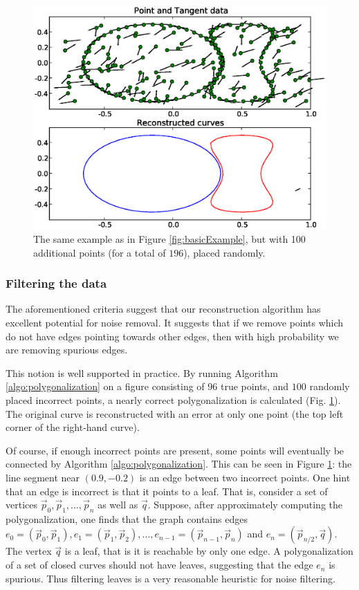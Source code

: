 \documentclass{article}
\numberwithin{cntr}{section}
\numberwithin{equation}{section}
\newcommand{\vp}[0]{{\vec{p}}}
\newcommand{\vq}[0]{{\vec{q}}}
\begin{document}
\begin{figure}
\setlength{\unitlength}{0.240900pt}
\ifx\plotpoint\undefined\newsavebox{\plotpoint}\fi
\sbox{\plotpoint}{\rule[-0.200pt]{0.400pt}{0.400pt}}%
\includegraphics[scale=0.5]{noisy_example.eps}
\caption{The same example as in Figure \ref{fig:basicExample}, but with
100 additional points (for a total of $196$), placed randomly. }
\label{fig:noisyExample}
\end{figure}

\subsubsection{Filtering the data}

The aforementioned criteria suggest that our reconstruction algorithm
has excellent potential for noise removal. It suggests that if we
remove points which do not have edges pointing towards other edges,
then with high probability we are removing spurious edges.

This notion is well supported in practice.
By running Algorithm \ref{algo:polygonalization} on a figure consisting of
$96$ true points, and $100$ randomly placed incorrect points, a nearly
correct polygonalization is calculated (Fig. \ref{fig:noisyExample}).
The original curve is reconstructed with an error at only one point
(the top left corner of the right-hand curve).

Of course, if enough incorrect points are present, some points will
eventually be connected by Algorithm \ref{algo:polygonalization}.
This can be seen in Figure \ref{fig:noisyExample}:
the line segment near $(0.9, -0.2)$ is an edge between two incorrect points.
One hint that an edge is incorrect is that it points to a leaf.
That is, consider a set of vertices $\vp_{0}, \vp_{1}, \ldots, \vp_{n}$
as well as $\vq$. Suppose, after approximately computing the
polygonalization, one finds that the graph contains edges
$e_{0} = (\vp_{0}, \vp_{1}), e_{1} = (\vp_{1}, \vp_{2}), \ldots, e_{n-1} =
(\vp_{n-1}, \vp_{n})$ and $e_{n} = (\vp_{n/2}, \vq)$. The vertex $\vq$ is
a leaf, that is it is reachable by only one edge. A polygonalization
of a set of closed curves should not have leaves, suggesting that the
edge $e_{n}$ is spurious.
Thus filtering leaves is a very reasonable heuristic for noise filtering.
\end{document}

